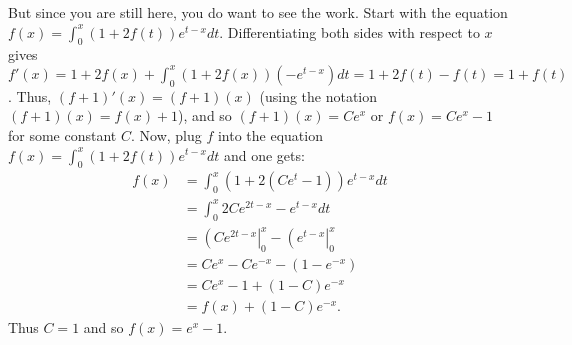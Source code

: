 \documentclass[11pt]{article}
\theoremstyle{definition}
\begin{document}
But since you are still here, you do want to see the work.  Start with the equation $f(x) = \int_0^x(1+2f(t))e^{t-x}dt$.  Differentiating both sides with respect to $x$ gives $f'(x) = 1 + 2f(x) + \int_0^x(1+2f(x))(-e^{t-x})dt = 1 + 2f(t) - f(t) = 1 + f(t)$.  Thus, $(f+1)'(x) = (f+1)(x)$ (using the notation $(f+1)(x) = f(x) + 1$), and so $(f+1)(x) = Ce^x$ or $f(x)  = Ce^x - 1$ for some constant $C$.  Now, plug $f$ into the equation $f(x) = \int_0^x(1+2f(t))e^{t-x}dt$ and one gets:
\begin{align*}
f(x) & = \int_0^x(1+2(Ce^t - 1))e^{t-x}dt \\
& = \int_0^x 2Ce^{2t-x} - e^{t-x} dt \\
& = \left(Ce^{2t-x}\right|_0^x - \left(e^{t-x}\right|_0^x \\
& = Ce^x - Ce^{-x} - (1 - e^{-x}) \\
& = Ce^x - 1 + (1-C)e^{-x} \\
& = f(x) + (1-C)e^{-x}.
\end{align*}
Thus $C = 1$ and so $f(x) = e^x - 1$.
\end{document}
